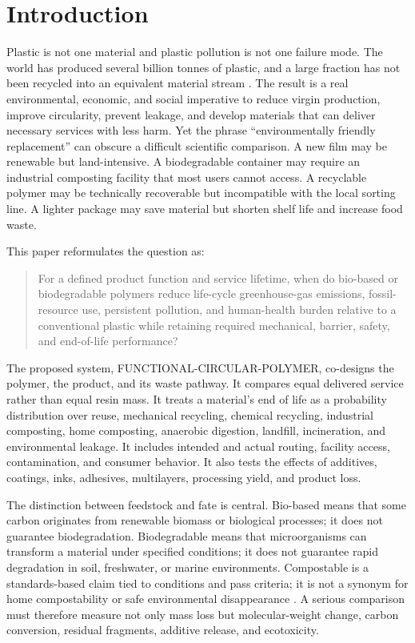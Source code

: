 \documentclass[conference]{IEEEtran}
\begin{document}
\section{Introduction}

Plastic is not one material and plastic pollution is not one failure mode. The world has produced several billion tonnes of plastic, and a large fraction has not been recycled into an equivalent material stream \cite{geyer}. The result is a real environmental, economic, and social imperative to reduce virgin production, improve circularity, prevent leakage, and develop materials that can deliver necessary services with less harm. Yet the phrase ``environmentally friendly replacement'' can obscure a difficult scientific comparison. A new film may be renewable but land-intensive. A biodegradable container may require an industrial composting facility that most users cannot access. A recyclable polymer may be technically recoverable but incompatible with the local sorting line. A lighter package may save material but shorten shelf life and increase food waste.

This paper reformulates the question as:

\begin{quote}
For a defined product function and service lifetime, when do bio-based or biodegradable polymers reduce life-cycle greenhouse-gas emissions, fossil-resource use, persistent pollution, and human-health burden relative to a conventional plastic while retaining required mechanical, barrier, safety, and end-of-life performance?
\end{quote}

The proposed system, FUNCTIONAL-CIRCULAR-POLYMER, co-designs the polymer, the product, and its waste pathway. It compares equal delivered service rather than equal resin mass. It treats a material's end of life as a probability distribution over reuse, mechanical recycling, chemical recycling, industrial composting, home composting, anaerobic digestion, landfill, incineration, and environmental leakage. It includes intended and actual routing, facility access, contamination, and consumer behavior. It also tests the effects of additives, coatings, inks, adhesives, multilayers, processing yield, and product loss.

The distinction between feedstock and fate is central. Bio-based means that some carbon originates from renewable biomass or biological processes; it does not guarantee biodegradation. Biodegradable means that microorganisms can transform a material under specified conditions; it does not guarantee rapid degradation in soil, freshwater, or marine environments. Compostable is a standards-based claim tied to conditions and pass criteria; it is not a synonym for home compostability or safe environmental disappearance \cite{song,haider,iso}. A serious comparison must therefore measure not only mass loss but molecular-weight change, carbon conversion, residual fragments, additive release, and ecotoxicity.
\end{document}
